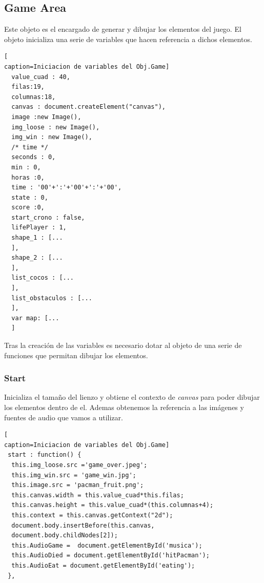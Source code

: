 \subsection{Game Area}
Este objeto es el encargado de generar y dibujar los elementos del  juego. El objeto inicializa una serie de variables que hacen referencia a dichos elementos.
\begin{lstlisting}[
caption=Iniciacion de variables del Obj.Game]
  value_cuad : 40,
  filas:19,
  columnas:18,
  canvas : document.createElement("canvas"),
  image :new Image(),
  img_loose : new Image(),
  img_win : new Image(),
  /* time */
  seconds : 0,
  min : 0,
  horas :0,
  time : '00'+':'+'00'+':'+'00',
  state : 0,
  score :0,
  start_crono : false,
  lifePlayer : 1,
  shape_1 : [...
  ],
  shape_2 : [...
  ],
  list_cocos : [...
  ],
  list_obstaculos : [...
  ],
  var map: [...
  ]
\end{lstlisting}
Tras la creación de las variables es necesario dotar al objeto de una serie de funciones que permitan dibujar los elementos.
\subsubsection*{Start}
Inicializa el tamaño del lienzo y obtiene el contexto de \textit{canvas} para poder dibujar los elementos dentro de el. Ademas obtenemos la referencia a las imágenes y fuentes de audio que vamos a utilizar.
\begin{lstlisting}[
caption=Iniciacion de variables del Obj.Game]
 start : function() {
  this.img_loose.src ='game_over.jpeg';
  this.img_win.src = 'game_win.jpg';
  this.image.src = 'pacman_fruit.png';
  this.canvas.width = this.value_cuad*this.filas;
  this.canvas.height = this.value_cuad*(this.columnas+4);
  this.context = this.canvas.getContext("2d");
  document.body.insertBefore(this.canvas, 
  document.body.childNodes[2]);
  this.AudioGame =  document.getElementById('musica');
  this.AudioDied = document.getElementById('hitPacman');
  this.AudioEat = document.getElementById('eating');
 },
\end{lstlisting}

